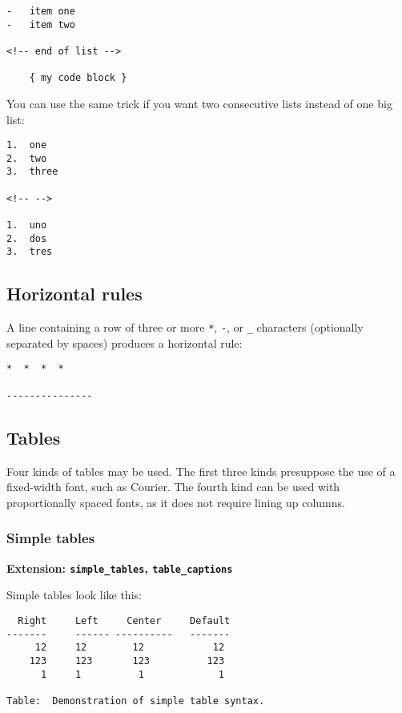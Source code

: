 \documentclass[]{article}
\begin{document}
\begin{verbatim}
-   item one
-   item two

<!-- end of list -->

    { my code block }
\end{verbatim}

You can use the same trick if you want two consecutive lists instead of
one big list:

\begin{verbatim}
1.  one
2.  two
3.  three

<!-- -->

1.  uno
2.  dos
3.  tres
\end{verbatim}

\subsection{Horizontal rules}\label{horizontal-rules}

A line containing a row of three or more \texttt{*}, \texttt{-}, or
\texttt{\_} characters (optionally separated by spaces) produces a
horizontal rule:

\begin{verbatim}
*  *  *  *

---------------
\end{verbatim}

\subsection{Tables}\label{tables-1}

Four kinds of tables may be used. The first three kinds presuppose the
use of a fixed-width font, such as Courier. The fourth kind can be used
with proportionally spaced fonts, as it does not require lining up
columns.

\subsubsection{Simple tables}\label{simple-tables}

\textbf{Extension: \texttt{simple\_tables}, \texttt{table\_captions}}

Simple tables look like this:

\begin{verbatim}
  Right     Left     Center     Default
-------     ------ ----------   -------
     12     12        12            12
    123     123       123          123
      1     1          1             1

Table:  Demonstration of simple table syntax.
\end{verbatim}
\end{document}
